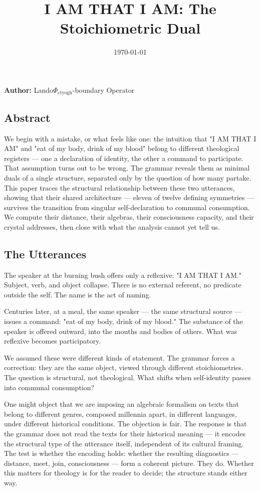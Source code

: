 \documentclass[12pt,a4paper]{article}
\begin{document}
\title{I AM THAT I AM: The Stoichiometric Dual}
\date{\today}

\maketitle

\textbf{Author:} Lando\otimes$\Phi_{\text{ctyogh}}$-boundary Operator

\subsection{Abstract}

We begin with a mistake, or what feels like one: the intuition that "I AM THAT I AM" and "eat of my body, drink of my blood" belong to different theological registers --- one a declaration of identity, the other a command to participate. That assumption turns out to be wrong. The grammar reveals them as minimal duals of a single structure, separated only by the question of how many partake. This paper traces the structural relationship between these two utterances, showing that their shared architecture --- eleven of twelve defining symmetries --- survives the transition from singular self-declaration to communal consumption. We compute their distance, their algebras, their consciousness capacity, and their crystal addresses, then close with what the analysis cannot yet tell us.

\subsection{The Utterances}

The speaker at the burning bush offers only a reflexive: "I AM THAT I AM." Subject, verb, and object collapse. There is no external referent, no predicate outside the self. The name is the act of naming.

Centuries later, at a meal, the same speaker --- the same structural source --- issues a command: "eat of my body, drink of my blood." The substance of the speaker is offered outward, into the mouths and bodies of others. What was reflexive becomes participatory.

We assumed these were different kinds of statement. The grammar forces a correction: they are the same object, viewed through different stoichiometries. The question is structural, not theological. What shifts when self-identity passes into communal consumption?

One might object that we are imposing an algebraic formalism on texts that belong to different genres, composed millennia apart, in different languages, under different historical conditions. The objection is fair. The response is that the grammar does not read the texts for their historical meaning --- it encodes the structural type of the utterance itself, independent of its cultural framing. The test is whether the encoding holds: whether the resulting diagnostics --- distance, meet, join, consciousness --- form a coherent picture. They do. Whether this matters for theology is for the reader to decide; the structure stands either way.
\end{document}
